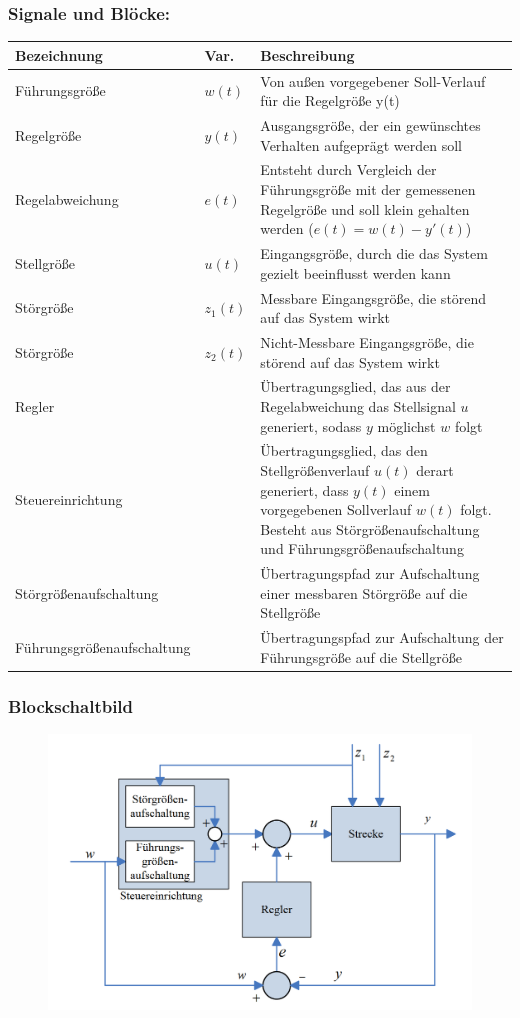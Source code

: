 \documentclass[10pt,a4paper]{article}
\begin{document}
\subsubsection*{Signale und Blöcke:}
\begin{tabularx}{\columnwidth}{llX}
	Bezeichnung & Var. & Beschreibung \\
	\hline
	Führungsgröße & $w(t)$ & Von außen vorgegebener Soll-Verlauf für die Regelgröße y(t) \\
	Regelgröße & $y(t)$ & Ausgangsgröße, der ein gewünschtes Verhalten aufgeprägt werden soll \\
	Regelabweichung & $e(t)$ & Entsteht durch Vergleich der Führungsgröße mit der gemessenen Regelgröße und soll klein gehalten werden ($e(t) = w(t) - y'(t)$) \\
	Stellgröße & $u(t)$ & Eingangsgröße, durch die das System gezielt beeinflusst werden kann \\
	Störgröße & $z_1(t)$ & Messbare Eingangsgröße, die störend auf das System wirkt \\
	Störgröße & $z_2(t)$ & Nicht-Messbare Eingangsgröße, die störend auf das System wirkt \\
	Regler && Übertragungsglied, das aus der Regelabweichung das Stellsignal $u$ generiert, sodass $y$ möglichst $w$ folgt \\
	Steuereinrichtung && Übertragungsglied, das den Stellgrößenverlauf $u(t)$ derart generiert, dass $y(t)$ einem vorgegebenen Sollverlauf $w(t)$ folgt. Besteht aus Störgrößenaufschaltung und Führungsgrößenaufschaltung \\
	Störgrößenaufschaltung && Übertragungspfad zur Aufschaltung einer messbaren Störgröße auf die Stellgröße \\
	Führungsgrößenaufschaltung && Übertragungspfad zur Aufschaltung der Führungsgröße auf die Stellgröße
\end{tabularx}

\subsubsection*{Blockschaltbild}
\begin{figure}[H]
	\includegraphics[width=0.8\columnwidth]{imgs/abb1_11.png}
\end{figure}
\end{document}
